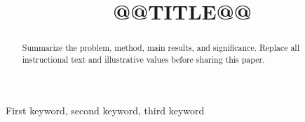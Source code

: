 \documentclass[conference,letterpaper]{IEEEtran}
\title{@@TITLE@@}
\author{
  \IEEEauthorblockN{Author Name}
  \IEEEauthorblockA{Department, Institution\\
    City, Country\\
    author@example.com}
}
\begin{document}
\maketitle
\begin{abstract}
Summarize the problem, method, main results, and significance. Replace all
instructional text and illustrative values before sharing this paper.
\end{abstract}
\begin{IEEEkeywords}
First keyword, second keyword, third keyword
\end{IEEEkeywords}




\end{document}
